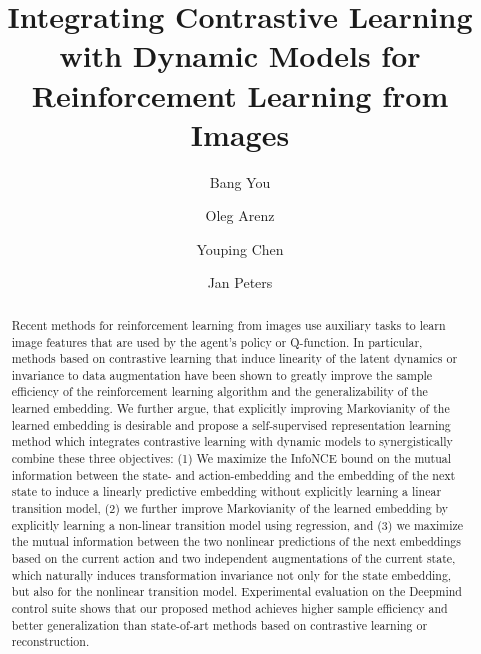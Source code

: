 \documentclass[a4paper,12pt]{article}
\begin{document}
\sloppy
\title{Integrating Contrastive Learning with Dynamic Models for Reinforcement Learning from Images}

\author[1,2]{Bang You}
\author[1]{Oleg Arenz}
\author[2]{Youping Chen}
\author[1]{Jan Peters}

\maketitle





\begin{abstract}
Recent methods for reinforcement learning from images use auxiliary tasks to learn image features that are used by the agent's policy or Q-function. In particular, methods based on contrastive learning that induce linearity of the latent dynamics or invariance to data augmentation have been shown to greatly improve the sample efficiency of the reinforcement learning algorithm and the generalizability of the learned embedding. We further argue, that explicitly improving Markovianity of the learned embedding is desirable and propose a self-supervised representation learning method which integrates contrastive learning with dynamic models to synergistically combine these three objectives: (1) We maximize the InfoNCE bound on the mutual information between the state- and action-embedding and the embedding of the next state to induce a linearly predictive embedding without explicitly learning a linear transition model, (2) we further improve Markovianity of the learned embedding by explicitly learning a non-linear transition model using regression, and (3) we maximize the mutual information between the two nonlinear predictions of the next embeddings based on the current action and two independent augmentations of the current state, which naturally induces transformation invariance not only for the state embedding, but also for the nonlinear transition model. Experimental evaluation on the Deepmind control suite shows that our proposed method achieves higher sample efficiency and better generalization than state-of-art methods based on contrastive learning or reconstruction.
\end{abstract}
\end{document}
